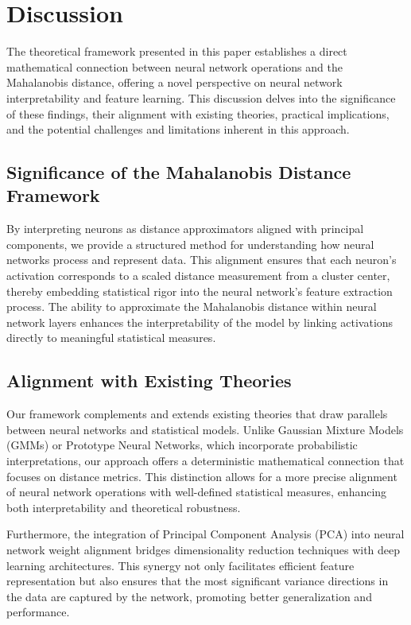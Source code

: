 
\section{Discussion}
\label{sec:discussion}

The theoretical framework presented in this paper establishes a direct mathematical connection between neural network operations and the Mahalanobis distance, offering a novel perspective on neural network interpretability and feature learning. This discussion delves into the significance of these findings, their alignment with existing theories, practical implications, and the potential challenges and limitations inherent in this approach.

\subsection{Significance of the Mahalanobis Distance Framework}

By interpreting neurons as distance approximators aligned with principal components, we provide a structured method for understanding how neural networks process and represent data. This alignment ensures that each neuron's activation corresponds to a scaled distance measurement from a cluster center, thereby embedding statistical rigor into the neural network's feature extraction process. The ability to approximate the Mahalanobis distance within neural network layers enhances the interpretability of the model by linking activations directly to meaningful statistical measures.

\subsection{Alignment with Existing Theories}

Our framework complements and extends existing theories that draw parallels between neural networks and statistical models. Unlike Gaussian Mixture Models (GMMs) or Prototype Neural Networks, which incorporate probabilistic interpretations, our approach offers a deterministic mathematical connection that focuses on distance metrics. This distinction allows for a more precise alignment of neural network operations with well-defined statistical measures, enhancing both interpretability and theoretical robustness.

Furthermore, the integration of Principal Component Analysis (PCA) into neural network weight alignment bridges dimensionality reduction techniques with deep learning architectures. This synergy not only facilitates efficient feature representation but also ensures that the most significant variance directions in the data are captured by the network, promoting better generalization and performance.

